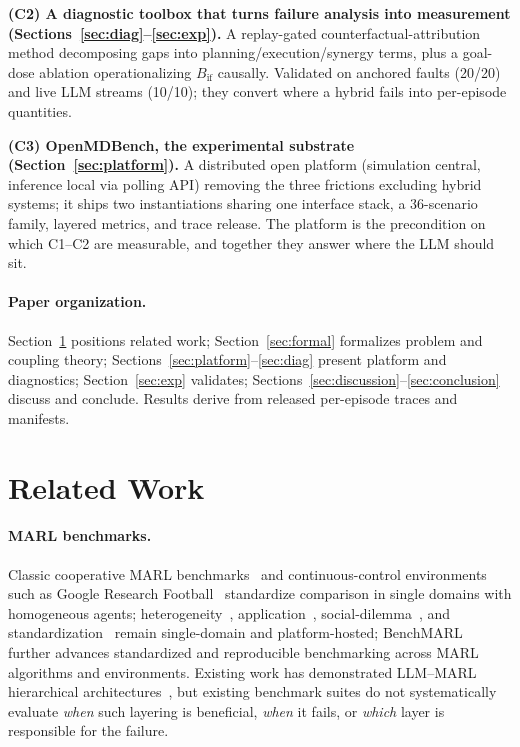 \documentclass[sigconf,anonymous]{aamas}
\newcommand{\Bif}{B_{\mathrm{if}}}
\begin{document}
\textbf{(C2) A diagnostic toolbox that turns failure analysis into measurement (Sections~\ref{sec:diag}--\ref{sec:exp}).} A replay-gated counterfactual-attribution method decomposing gaps into planning/execution/synergy terms, plus a goal-dose ablation operationalizing $\Bif$ causally. Validated on anchored faults (20/20) and live LLM streams (10/10); they convert where a hybrid fails into per-episode quantities.

\textbf{(C3) OpenMDBench, the experimental substrate (Section~\ref{sec:platform}).} A distributed open platform (simulation central, inference local via polling API) removing the three frictions excluding hybrid systems; it ships two instantiations sharing one interface stack, a 36-scenario family, layered metrics, and trace release. The platform is the precondition on which C1--C2 are measurable, and together they answer where the LLM should sit.

\paragraph{Paper organization.}
Section~\ref{sec:related} positions related work; Section~\ref{sec:formal} formalizes problem and coupling theory; Sections~\ref{sec:platform}--\ref{sec:diag} present platform and diagnostics; Section~\ref{sec:exp} validates; Sections~\ref{sec:discussion}--\ref{sec:conclusion} discuss and conclude. Results derive from released per-episode traces and manifests.

\section{Related Work}\label{sec:related}

\paragraph{MARL benchmarks.}
Classic cooperative MARL benchmarks~\cite{smac,smacv2} and continuous-control environments such as Google Research Football~\cite{grf} standardize comparison in single domains with homogeneous agents; heterogeneity~\cite{hemac,lshc,poac}, application~\cite{ape,hivex}, social-dilemma~\cite{meltingpot}, and standardization~\cite{pettingzoo,benchmarl,marllib} remain single-domain and platform-hosted; BenchMARL~\cite{benchmarl} further advances standardized and reproducible benchmarking across MARL algorithms and environments. Existing work has demonstrated LLM--MARL hierarchical architectures~\cite{lamarl,lgcmarl,l2m2,reflectivellm}, but existing benchmark suites do not systematically evaluate \emph{when} such layering is beneficial, \emph{when} it fails, or \emph{which} layer is responsible for the failure.
\end{document}
